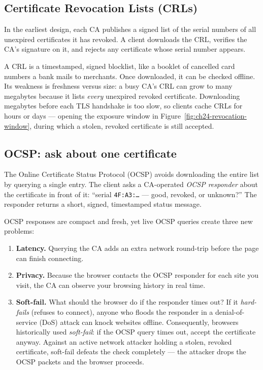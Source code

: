 \subsection{Certificate Revocation Lists (CRLs)}

In the earliest design, each CA publishes a signed list of the serial numbers of all unexpired certificates it has revoked. A client downloads the CRL, verifies the CA's signature on it, and rejects any certificate whose serial number appears.

\begin{intuitionbox}
A CRL is a timestamped, signed blocklist, like a booklet of cancelled card numbers a bank mails to merchants. Once downloaded, it can be checked offline. Its weakness is freshness versus size: a busy CA's CRL can grow to many megabytes because it lists \emph{every} unexpired revoked certificate. Downloading megabytes before each TLS handshake is too slow, so clients cache CRLs for hours or days --- opening the exposure window in Figure~\ref{fig:ch24-revocation-window}, during which a stolen, revoked certificate is still accepted.
\end{intuitionbox}

\subsection{OCSP: ask about one certificate}

The Online Certificate Status Protocol (OCSP) avoids downloading the entire list by querying a single entry. The client asks a CA-operated \emph{OCSP responder} about the certificate in front of it: ``serial \texttt{4F:A3:\dots} --- good, revoked, or unknown?'' The responder returns a short, signed, timestamped status message.

OCSP responses are compact and fresh, yet live OCSP queries create three new problems:

\begin{enumerate}
\item \textbf{Latency.} Querying the CA adds an extra network round-trip before the page can finish connecting.
\item \textbf{Privacy.} Because the browser contacts the OCSP responder for each site you visit, the CA can observe your browsing history in real time.
\item \textbf{Soft-fail.} What should the browser do if the responder times out? If it \emph{hard-fails} (refuses to connect), anyone who floods the responder in a denial-of-service (DoS) attack can knock websites offline. Consequently, browsers historically used \emph{soft-fail}: if the OCSP query times out, accept the certificate anyway. Against an active network attacker holding a stolen, revoked certificate, soft-fail defeats the check completely --- the attacker drops the OCSP packets and the browser proceeds.
\end{enumerate}

